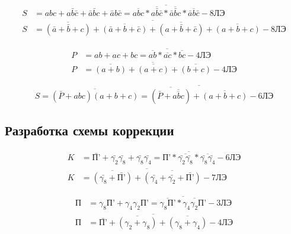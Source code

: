 \documentclass[a4paper,14pt]{article}
\begin{document}
\begin{equation*}
\begin{aligned}
	S &= abc + a\bar{b}\bar{c} + \bar{a}\bar{b}c + \bar{a}b\bar{c} = \overline{\overline{abc} * \overline{a\bar{b}\bar{c}} * \overline{\bar{a}\bar{b}c} * \overline{\bar{a}b\bar{c}}} - \text{8ЛЭ} \\
	S &= \overline{\overline{(\bar{a}+\bar{b}+c)} + \overline{(\bar{a}+b+\bar{c})} + \overline{(a+\bar{b}+\bar{c})} + \overline{(a+b+c)}} - \text{8ЛЭ}
\end{aligned}
\end{equation*}

\begin{equation*}
\begin{aligned}
	P &= ab + ac + bc = \overline{\overline{ab} * \overline{ac} * \overline{bc}} - \text{4ЛЭ} \\
	P &= \overline{\overline{(a+b)} + \overline{(a+c)} + \overline{(b+c)}} - \text{4ЛЭ}
\end{aligned}
\end{equation*}

\begin{equation*}
	S = \overline{(\bar{P} + abc) (a + b + c)} = \overline{\overline{(\bar{P} + \overline{\overline{abc}})} + \overline{(a+b+c)}} - \text{6ЛЭ}
\end{equation*}


\subsection{Разработка схемы коррекции}

\begin{equation*}
\begin{aligned}
K &= \bar{\text{П'}} + \bar{\gamma_2}\bar{\gamma_8} + \bar{\gamma_8}\bar{\gamma_4} = \overline{\text{П'}*\overline{\bar{\gamma_2}\bar{\gamma_8}}*\overline{\bar{\gamma_8}\bar{\gamma_4}}}- \text{6ЛЭ} \\
K &= \overline{\overline{(\bar{\gamma_8}+\bar{\text{П'}})} + \overline{(\bar{\gamma_4}+\bar{\gamma_2}+\bar{\text{П'}})}} - \text{7ЛЭ}
\end{aligned}
\end{equation*}

\begin{equation*}
\begin{aligned}
\text{П} &= \gamma_8\text{П'} + \gamma_4\gamma_2\text{П'} = \overline{\overline{\gamma_8\text{П'}}*\overline{\gamma_4\gamma_2\text{П'}}} - \text{3ЛЭ} \\
\text{П} &= \overline{\bar{\text{П'}} + \overline{(\gamma_2+\gamma_8)} + \overline{(\gamma_8+\gamma_4)}} - \text{4ЛЭ}
\end{aligned}
\end{equation*}
\end{document}
